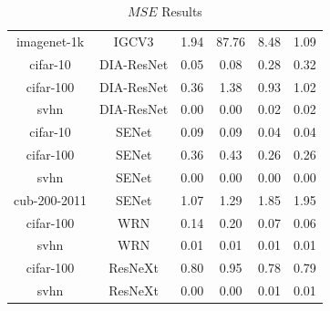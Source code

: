 \begin{table}[t]
\begin{center}
\begin{tabular}{|c|c|c|c|c|c|}
 imagenet-1k & IGCV3  & 1.94 &  87.76 & 8.48 & 1.09 \\
 cifar-10 & DIA-ResNet  & 0.05 &  0.08 & 0.28 & 0.32 \\
 cifar-100 & DIA-ResNet  & 0.36 &  1.38 & 0.93 & 1.02 \\
 svhn & DIA-ResNet  & 0.00 &  0.00 & 0.02 & 0.02 \\
 cifar-10 & SENet  & 0.09 &  0.09 & 0.04 & 0.04 \\
 cifar-100 & SENet  & 0.36 &  0.43 & 0.26 & 0.26 \\
 svhn & SENet  & 0.00 &  0.00 & 0.00 & 0.00 \\
 cub-200-2011 & SENet  & 1.07 &  1.29 & 1.85 & 1.95 \\
 cifar-100 & WRN  & 0.14 &  0.20 & 0.07 & 0.06 \\
 svhn & WRN  & 0.01 &  0.01 & 0.01 & 0.01 \\
 cifar-100 & ResNeXt  & 0.80 &  0.95 & 0.78 & 0.79 \\
 svhn & ResNeXt  & 0.00 &  0.00 & 0.01 & 0.01 \\
\hline
\end{tabular}
\end{center}
\caption{$MSE$ Results}
\label{table:MSEresults}
\end{table}


